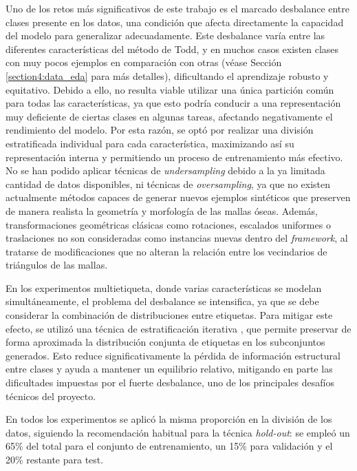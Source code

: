 Uno de los retos más significativos de este trabajo es el marcado desbalance entre clases presente en los datos, una condición que afecta directamente la capacidad del modelo para generalizar adecuadamente. Este desbalance varía entre las diferentes características del método de Todd, y en muchos casos existen clases con muy pocos ejemplos en comparación con otras (véase Sección \ref{section4:data_eda} para más detalles), dificultando el aprendizaje robusto y equitativo. Debido a ello, no resulta viable utilizar una única partición común para todas las características, ya que esto podría conducir a una representación muy deficiente de ciertas clases en algunas tareas, afectando negativamente el rendimiento del modelo. Por esta razón, se optó por realizar una división estratificada individual para cada característica, maximizando así su representación interna y permitiendo un proceso de entrenamiento más efectivo. No se han podido aplicar técnicas de \textit{undersampling} debido a la ya limitada cantidad de datos disponibles, ni técnicas de \textit{oversampling}, ya que no existen actualmente métodos capaces de generar nuevos ejemplos sintéticos que preserven de manera realista la geometría y morfología de las mallas óseas. Además, transformaciones geométricas clásicas como rotaciones, escalados uniformes o traslaciones no son consideradas como instancias nuevas dentro del \textit{framework}, al tratarse de modificaciones que no alteran la relación entre los vecindarios de triángulos de las mallas.

En los experimentos multietiqueta, donde varias características se modelan simultáneamente, el problema del desbalance se intensifica, ya que se debe considerar la combinación de distribuciones entre etiquetas. Para mitigar este efecto, se utilizó una técnica de estratificación iterativa \cite{sechidis2011stratification, pmlr-v74-szymański17a}, que permite preservar de forma aproximada la distribución conjunta de etiquetas en los subconjuntos generados. Esto reduce significativamente la pérdida de información estructural entre clases y ayuda a mantener un equilibrio relativo, mitigando en parte las dificultades impuestas por el fuerte desbalance, uno de los principales desafíos técnicos del proyecto. 

En todos los experimentos se aplicó la misma proporción en la división de los datos, siguiendo la recomendación habitual para la técnica \textit{hold-out}: se empleó un 65\% del total para el conjunto de entrenamiento, un 15\% para validación y el 20\% restante para test.

